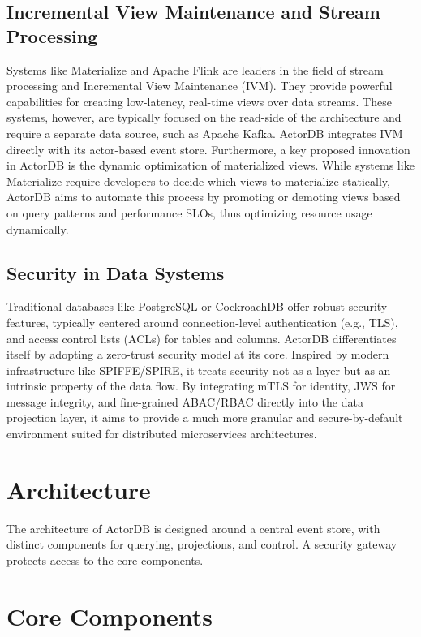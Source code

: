 \documentclass{article}
\begin{document}
\subsection{Incremental View Maintenance and Stream Processing}
Systems like Materialize and Apache Flink are leaders in the field of stream processing and Incremental View Maintenance (IVM). They provide powerful capabilities for creating low-latency, real-time views over data streams. These systems, however, are typically focused on the read-side of the architecture and require a separate data source, such as Apache Kafka. ActorDB integrates IVM directly with its actor-based event store. Furthermore, a key proposed innovation in ActorDB is the dynamic optimization of materialized views. While systems like Materialize require developers to decide which views to materialize statically, ActorDB aims to automate this process by promoting or demoting views based on query patterns and performance SLOs, thus optimizing resource usage dynamically.

\subsection{Security in Data Systems}
Traditional databases like PostgreSQL or CockroachDB offer robust security features, typically centered around connection-level authentication (e.g., TLS), and access control lists (ACLs) for tables and columns. ActorDB differentiates itself by adopting a zero-trust security model at its core. Inspired by modern infrastructure like SPIFFE/SPIRE, it treats security not as a layer but as an intrinsic property of the data flow. By integrating mTLS for identity, JWS for message integrity, and fine-grained ABAC/RBAC directly into the data projection layer, it aims to provide a much more granular and secure-by-default environment suited for distributed microservices architectures.

\section{Architecture}

The architecture of ActorDB is designed around a central event store, with distinct components for querying, projections, and control. A security gateway protects access to the core components.

\section{Core Components}
\end{document}
